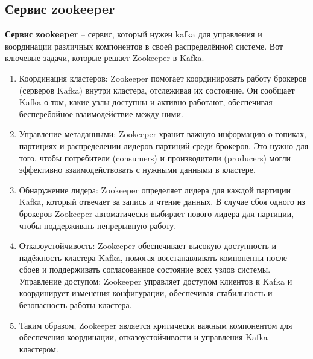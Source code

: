 \subsection{Сервис zookeeper}

\textbf{Сервис zookeeper} \cite{zookeeper} -- сервис, который нужен kafka для управления и координации различных компонентов в своей распределённой системе. Вот ключевые задачи, которые решает Zookeeper в Kafka.

\begin{enumerate}
  \item Координация кластеров: Zookeeper помогает координировать работу брокеров (серверов Kafka) внутри кластера, отслеживая их состояние. Он сообщает Kafka о том, какие узлы доступны и активно работают, обеспечивая бесперебойное взаимодействие между ними.
  \item Управление метаданными: Zookeeper хранит важную информацию о топиках, партициях и распределении лидеров партиций среди брокеров. Это нужно для того, чтобы потребители (consumers) и производители (producers) могли эффективно взаимодействовать с нужными данными в кластере.
  \item Обнаружение лидера: Zookeeper определяет лидера для каждой партиции Kafka, который отвечает за запись и чтение данных. В случае сбоя одного из брокеров Zookeeper автоматически выбирает нового лидера для партиции, чтобы поддерживать непрерывную работу.
  \item Отказоустойчивость: Zookeeper обеспечивает высокую доступность и надёжность кластера Kafka, помогая восстанавливать компоненты после сбоев и поддерживать согласованное состояние всех узлов системы.
  Управление доступом: Zookeeper управляет доступом клиентов к Kafka и координирует изменения конфигурации, обеспечивая стабильность и безопасность работы кластера.
  \item Таким образом, Zookeeper является критически важным компонентом для обеспечения координации, отказоустойчивости и управления Kafka-кластером.
\end{enumerate}


